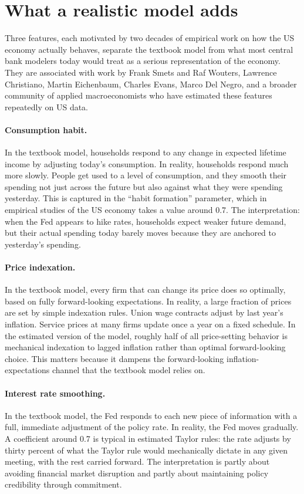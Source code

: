 \documentclass[12pt]{article}
\begin{document}
\section{What a realistic model adds}

Three features, each motivated by two decades of empirical work on how the US economy actually behaves, separate the textbook model from what most central bank modelers today would treat as a serious representation of the economy. They are associated with work by Frank Smets and Raf Wouters, Lawrence Christiano, Martin Eichenbaum, Charles Evans, Marco Del Negro, and a broader community of applied macroeconomists who have estimated these features repeatedly on US data.

\paragraph{Consumption habit.} In the textbook model, households respond to any change in expected lifetime income by adjusting today's consumption. In reality, households respond much more slowly. People get used to a level of consumption, and they smooth their spending not just across the future but also against what they were spending yesterday. This is captured in the ``habit formation'' parameter, which in empirical studies of the US economy takes a value around 0.7. The interpretation: when the Fed appears to hike rates, households expect weaker future demand, but their actual spending today barely moves because they are anchored to yesterday's spending.

\paragraph{Price indexation.} In the textbook model, every firm that can change its price does so optimally, based on fully forward-looking expectations. In reality, a large fraction of prices are set by simple indexation rules. Union wage contracts adjust by last year's inflation. Service prices at many firms update once a year on a fixed schedule. In the estimated version of the model, roughly half of all price-setting behavior is mechanical indexation to lagged inflation rather than optimal forward-looking choice. This matters because it dampens the forward-looking inflation-expectations channel that the textbook model relies on.

\paragraph{Interest rate smoothing.} In the textbook model, the Fed responds to each new piece of information with a full, immediate adjustment of the policy rate. In reality, the Fed moves gradually. A coefficient around 0.7 is typical in estimated Taylor rules: the rate adjusts by thirty percent of what the Taylor rule would mechanically dictate in any given meeting, with the rest carried forward. The interpretation is partly about avoiding financial market disruption and partly about maintaining policy credibility through commitment.
\end{document}
